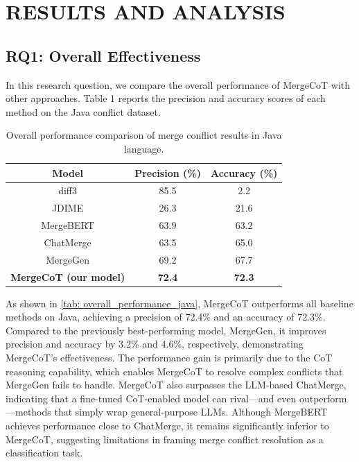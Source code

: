 \documentclass[sigconf,review,anonymous]{acmart}
\begin{document}
\section{RESULTS AND ANALYSIS}
\subsection{RQ1: Overall Effectiveness}
In this research question, we compare the overall performance of MergeCoT with other approaches. Table 1 reports the precision and accuracy scores of each method on the Java conflict dataset.

\begin{table}[ht]
\caption{Overall performance comparison of merge conflict results in Java language.}
\centering
\begin{tabular}{ccc}
\hline
\multicolumn{1}{c}{Model} & \multicolumn{1}{c}{Precision (\%)} & \multicolumn{1}{c}{Accuracy (\%)} \\ \hline
diff3                            & 85.5                               & 2.2                               \\
JDIME                            & 26.3                               & 21.6                              \\
MergeBERT                        & 63.9                               & 63.2                              \\
ChatMerge                        & 63.5                               & 65.0                              \\
MergeGen                         & 69.2                               & 67.7                              \\ \hline
\textbf{MergeCoT (our model)}    & \textbf{72.4}                      & \textbf{72.3}                     \\ \hline
\end{tabular}
\label{tab: overall_performance_java}
\end{table}


As shown in \autoref{tab: overall_performance_java}, MergeCoT outperforms all baseline methods on Java, achieving a precision of 72.4\% and an accuracy of 72.3\%. 
Compared to the previously best-performing model, MergeGen, it improves precision and accuracy by 3.2\% and 4.6\%, respectively, demonstrating MergeCoT's effectiveness. 
The performance gain is primarily due to the CoT reasoning capability, which enables MergeCoT to resolve complex conflicts that MergeGen fails to handle.
MergeCoT also surpasses the LLM-based ChatMerge, indicating that a fine-tuned CoT-enabled model can rival—and even outperform—methods that simply wrap general-purpose LLMs. Although MergeBERT achieves performance close to ChatMerge, it remains significantly inferior to MergeCoT, suggesting limitations in framing merge conflict resolution as a classification task.
\end{document}
